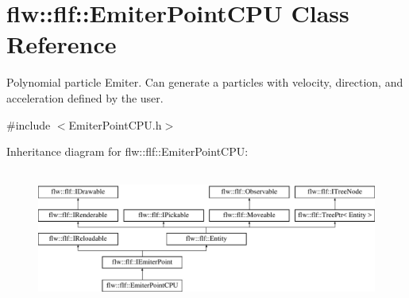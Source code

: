 \hypertarget{classflw_1_1flf_1_1EmiterPointCPU}{}\section{flw\+:\+:flf\+:\+:Emiter\+Point\+C\+PU Class Reference}
\label{classflw_1_1flf_1_1EmiterPointCPU}


Polynomial particle Emiter. Can generate a particles with velocity, direction, and acceleration defined by the user.  




{\ttfamily \#include $<$Emiter\+Point\+C\+P\+U.\+h$>$}

Inheritance diagram for flw\+:\+:flf\+:\+:Emiter\+Point\+C\+PU\+:\begin{figure}[H]
\begin{center}
\leavevmode
\includegraphics[height=4.487180cm]{classflw_1_1flf_1_1EmiterPointCPU}
\end{center}
\end{figure}

